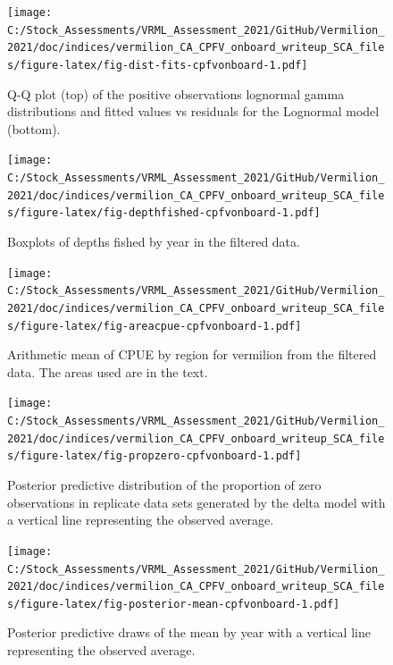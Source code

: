 \documentclass[
  english,
  a4paper,
]{article}
\begin{document}
\FloatBarrier

\begin{figure}
\centering
\texttt{[image: C:/Stock\_Assessments/VRML\_Assessment\_2021/GitHub/Vermilion\_2021/doc/indices/vermilion\_CA\_CPFV\_onboard\_writeup\_SCA\_files/figure-latex/fig-dist-fits-cpfvonboard-1.pdf]}
\caption{\label{fig:fig-dist-fits-cpfvonboard}Q-Q plot (top) of the positive observations lognormal gamma distributions and fitted values vs residuals for the Lognormal model (bottom).}
\end{figure}

\begin{figure}
\centering
\texttt{[image: C:/Stock\_Assessments/VRML\_Assessment\_2021/GitHub/Vermilion\_2021/doc/indices/vermilion\_CA\_CPFV\_onboard\_writeup\_SCA\_files/figure-latex/fig-depthfished-cpfvonboard-1.pdf]}
\caption{\label{fig:fig-depthfished-cpfvonboard}Boxplots of depths fished by year in the filtered data.}
\end{figure}

\begin{figure}
\centering
\texttt{[image: C:/Stock\_Assessments/VRML\_Assessment\_2021/GitHub/Vermilion\_2021/doc/indices/vermilion\_CA\_CPFV\_onboard\_writeup\_SCA\_files/figure-latex/fig-areacpue-cpfvonboard-1.pdf]}
\caption{\label{fig:fig-areacpue-cpfvonboard}Arithmetic mean of CPUE by region for vermilion from the filtered data. The areas used are in the text.}
\end{figure}

\begin{figure}
\centering
\texttt{[image: C:/Stock\_Assessments/VRML\_Assessment\_2021/GitHub/Vermilion\_2021/doc/indices/vermilion\_CA\_CPFV\_onboard\_writeup\_SCA\_files/figure-latex/fig-propzero-cpfvonboard-1.pdf]}
\caption{\label{fig:fig-propzero-cpfvonboard}Posterior predictive distribution of the proportion of zero observations in replicate data sets generated by the delta model with a vertical line representing the observed average.}
\end{figure}

\begin{figure}
\centering
\texttt{[image: C:/Stock\_Assessments/VRML\_Assessment\_2021/GitHub/Vermilion\_2021/doc/indices/vermilion\_CA\_CPFV\_onboard\_writeup\_SCA\_files/figure-latex/fig-posterior-mean-cpfvonboard-1.pdf]}
\caption{\label{fig:fig-posterior-mean-cpfvonboard}Posterior predictive draws of the mean by year with a vertical line representing the observed average.}
\end{figure}
\end{document}
